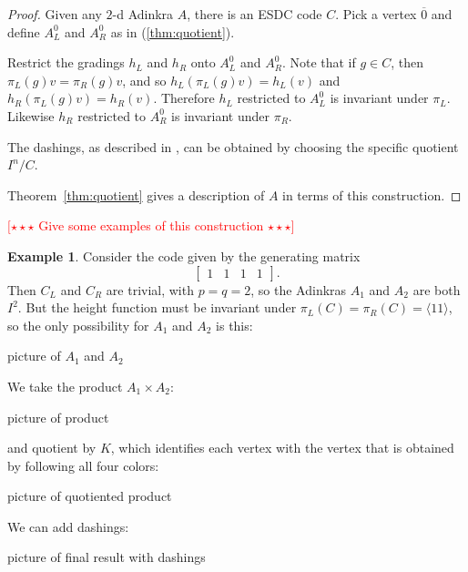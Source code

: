 \documentclass[12pt,twoside,singlespace]{article}
\numberwithin{equation}{section}
\theoremstyle{definition}
\newtheorem{ex}[equation]{Example}
\newcommand{\com}[1]{\textcolor{red}{$[\star \star \star$ #1 $\star \star \star]$}}
\begin{document}
\begin{proof}
Given any $2$-d Adinkra $A$, there is an ESDC code $C$.  Pick a vertex $\overline{0}$ and define $A_L^0$ and $A_R^0$ as in (\ref{thm:quotient}).

Restrict the gradings $h_L$ and $h_R$ onto $A_L^0$ and $A_R^0$.  Note that if $g\in C$, then $\pi_L(g)v=\pi_R(g)v$, and so $h_L(\pi_L(g)v)=h_L(v)$ and $h_R(\pi_L(g)v)=h_R(v)$.  Therefore $h_L$ restricted to $A_L^0$ is invariant under $\pi_L$.  Likewise $h_R$ restricted to $A_R^0$ is invariant under $\pi_R$.

The dashings, as described in \cite{d2l:topology}, can be obtained by choosing the specific quotient $I^n/C$.

Theorem~\ref{thm:quotient} gives a description of $A$ in terms of this construction.
\end{proof}

\com{Give some examples of this construction}

\begin{ex}
Consider the code given by the generating matrix
\[\left[\begin{array}{cc|cc}
1&1&1&1
\end{array}\right].\]
Then $C_L$ and $C_R$ are trivial, with $p=q=2$, so the Adinkras $A_1$ and $A_2$ are both $I^2$.  But the height function must be invariant under $\pi_L(C)=\pi_R(C)=\langle 11\rangle$, so the only possibility for $A_1$ and $A_2$ is this:
\begin{center}
picture of $A_1$ and $A_2$
\end{center}

We take the product $A_1\times A_2$:
\begin{center}
picture of product
\end{center}
and quotient by $K$, which identifies each vertex with the vertex that is obtained by following all four colors:
\begin{center}
picture of quotiented product
\end{center}
We can add dashings:
\begin{center}
picture of final result with dashings
\end{center}
\end{ex}
\end{document}

